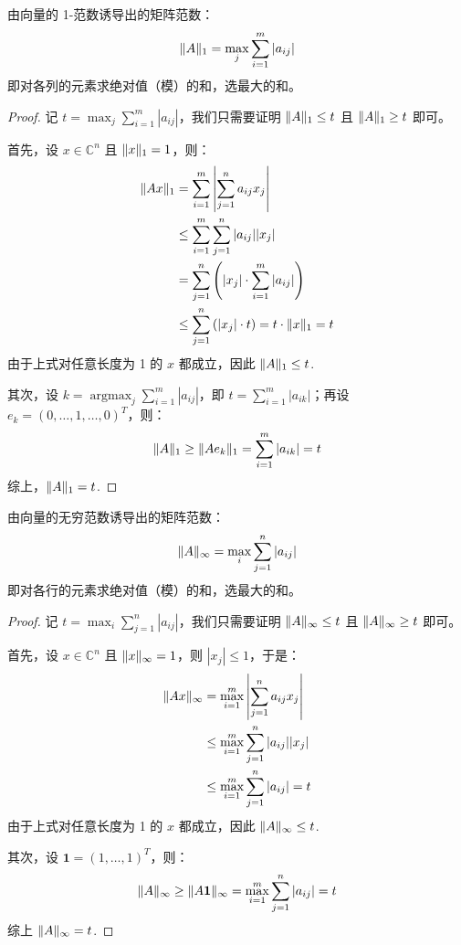 \begin{example}[1-范数/列范数]
由向量的 1-范数诱导出的矩阵范数：
\[
    \Vert A\Vert_1=\max_{j}\sum_{i=1}^m|a_{ij}|
\]
即对各列的元素求绝对值（模）的和，选最大的和。
\end{example}
\begin{proof}
记 $t=\max_{j}\sum_{i=1}^m|a_{ij}|$，我们只需要证明 $\Vert A\Vert_1\leq t$ 且 $\Vert A\Vert_1\geq t$ 即可。

首先，设 $x\in\mathbb C^n$ 且 $\Vert x\Vert_1=1$，则：
\begin{align*}
    \Vert Ax\Vert_1&=\sum_{i=1}^m\left|\sum_{j=1}^na_{ij}x_j\right|\\
    &\leq\sum_{i=1}^m\sum_{j=1}^n|a_{ij}||x_j|\\
    &=\sum_{j=1}^n\left(|x_j|\cdot\sum_{i=1}^m|a_{ij}|\right)\\
    &\leq\sum_{j=1}^n\left(|x_j|\cdot t\right)
    =t\cdot\Vert x\Vert_1=t
\end{align*}
由于上式对任意长度为 1 的 $x$ 都成立，因此 $\Vert A\Vert_1\leq t$.

其次，设 $k=\mathop{\text{argmax }}_{j}\sum_{i=1}^m|a_{ij}|$，即 $t=\sum_{i=1}^m|a_{ik}|$；再设 $e_k=(0,\ldots,1,\ldots,0)^T$，则：
\[
    \Vert A\Vert_1\geq\Vert Ae_k\Vert_1=\sum_{i=1}^m|a_{ik}|=t
\]
综上，$\Vert A\Vert_1=t$.
\end{proof}

\begin{example}
由向量的无穷范数诱导出的矩阵范数：
\[
    \Vert A\Vert_\infty=\max_i\sum_{j=1}^n|a_{ij}|
\]
即对各行的元素求绝对值（模）的和，选最大的和。
\end{example}
\begin{proof}
记 $t=\max_{i}\sum_{j=1}^n|a_{ij}|$，我们只需要证明 $\Vert A\Vert_\infty\leq t$ 且 $\Vert A\Vert_\infty\geq t$ 即可。

首先，设 $x\in\mathbb C^n$ 且 $\Vert x\Vert_\infty=1$，则 $|x_j|\leq 1$，于是：
\begin{align*}
    \Vert Ax\Vert_\infty&=\max_{i=1}^m\left|\sum_{j=1}^na_{ij}x_j\right|\\
    &\leq\max_{i=1}^m\sum_{j=1}^n|a_{ij}||x_j|\\
    &\leq\max_{i=1}^m\sum_{j=1}^n|a_{ij}|=t
\end{align*}
由于上式对任意长度为 1 的 $x$ 都成立，因此 $\Vert A\Vert_\infty\leq t$.

其次，设 $\mathbf1=(1,\ldots,1)^T$，则：
\[
    \Vert A\Vert_\infty\geq\Vert A\mathbf1\Vert_\infty=\max_{i=1}^m\sum_{j=1}^n|a_{ij}|=t
\]
综上 $\Vert A\Vert_\infty=t$.
\end{proof}

